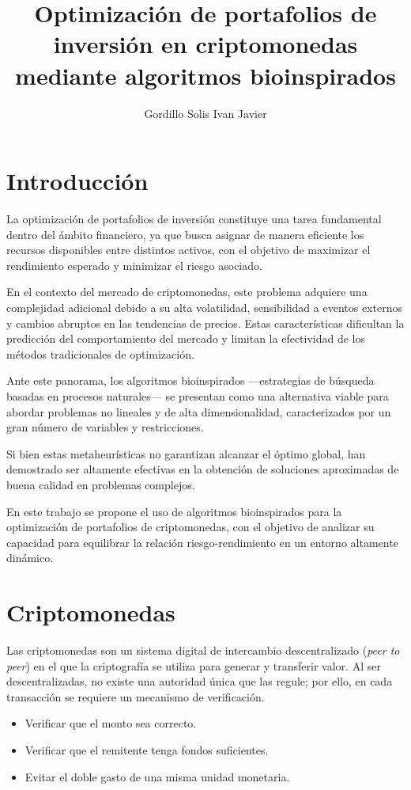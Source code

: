 \documentclass[12pt]{article}
\title{Optimización de portafolios de inversión en criptomonedas
mediante algoritmos bioinspirados}
\author{Gordillo Solis Ivan Javier}
\date{}
\begin{document}
\maketitle

\tableofcontents
\newpage
\section{Introducción}

La optimización de portafolios de inversión constituye una tarea
fundamental dentro del ámbito financiero, ya que busca asignar de
manera eficiente los recursos disponibles entre distintos activos,
con el objetivo de maximizar el rendimiento esperado y minimizar el
riesgo asociado.

En el contexto del mercado de criptomonedas, este problema adquiere
una complejidad adicional debido a su alta volatilidad, sensibilidad
a eventos externos y cambios abruptos en las tendencias de precios.
Estas características dificultan la predicción del comportamiento del
mercado y limitan la efectividad de los métodos tradicionales de optimización.

Ante este panorama, los algoritmos bioinspirados —estrategias de
búsqueda basadas en procesos naturales— se presentan como una
alternativa viable para abordar problemas no lineales y de alta
dimensionalidad, caracterizados por un gran número de variables y restricciones.

Si bien estas metaheurísticas no garantizan alcanzar el óptimo
global, han demostrado ser altamente efectivas en la obtención de
soluciones aproximadas de buena calidad en problemas complejos.

En este trabajo se propone el uso de algoritmos bioinspirados para la
optimización de portafolios de criptomonedas, con el objetivo de
analizar su capacidad para equilibrar la relación riesgo-rendimiento
en un entorno altamente dinámico.
 \section{Criptomonedas}

Las criptomonedas son un sistema digital de intercambio
descentralizado (\textit{peer to peer}) en el que la criptografía se
utiliza para generar y transferir valor. Al ser descentralizadas, no
existe una autoridad única que las regule; por ello, en cada
transacción se requiere un mecanismo de verificación.

\begin{itemize}
  \item Verificar que el monto sea correcto.
  \item Verificar que el remitente tenga fondos suficientes.
  \item Evitar el doble gasto de una misma unidad monetaria.
\end{itemize}
\end{document}

